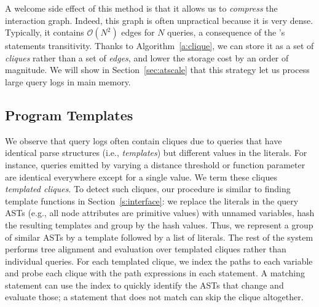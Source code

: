 A welcome side effect of this method is that it allows us to \emph{compress} the interaction graph. Indeed, this graph is often unpractical because it is very dense. Typically, it contains $\mathcal{O}(N^2)$ edges for $N$ queries, a consequence of the \lang's statements transitivity. Thanks to Algorithm~\ref{a:clique}, we can store it as a set of \emph{cliques} rather than a set of \emph{edges}, and lower the storage cost by an order of magnitude. We will show in Section~\ref{sec:atscale} that this strategy let us process large query logs in main memory.


\iffalse
\begin{verbatim}
|P@old - P@new| == 1;
W@old != W@new;
\end{verbatim}
\fi

\subsection{Program Templates}\label{s:templates}

We observe that query logs often contain cliques due to queries that have identical parse structures (i.e., {\it templates}) but different values in the literals.  For instance, queries emitted by varying a distance threshold or function parameter are identical everywhere except for a single value.  We term these cliques {\it templated cliques}.
To detect such cliques, our procedure is similar to finding template functions in Section~\ref{s:interface}: we replace the literals in the query ASTs (e.g., all node attributes are primitive values) with unnamed variables, hash the resulting templates and group by the hash values. Thus, we represent a group of similar ASTs by a template followed by a list of literals.  The rest of the system performs tree alignment and \lang evaluation over templated cliques rather than individual queries.  For each templated clique, we index the paths to each variable and probe each clique with the path expressions in each \lang statement.  A matching statement can use the index to quickly identify the ASTs that change and evaluate those; a statement that does not match can skip the clique altogether.

